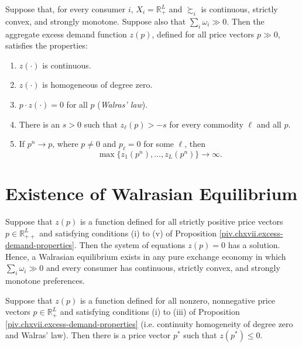\begin{prop}\label{piv.chxvii.excess-demand-properties}
    Suppose that, for every consumer $i$, $X_i = \mathbb{R}^L_+$ and $\succsim_i$ is continuous, strictly convex, and strongly monotone. Suppose also that $\sum_i \omega_i \gg 0$. Then the aggregate excess demand function $z(p)$, defined for all price vectors $p \gg 0$, satisfies the properties:
    \begin{enumerate}
        \item $z(\cdot)$ is continuous.
        \item $z(\cdot)$ is homogeneous of degree zero.
        \item $p \cdot z(\cdot) = 0$ for all $p$ (\emph{Walras' law}).
        \item There is an $s > 0$ such that $z_\ell(p) > -s$ for every commodity $\ell$ and all $p$.
        \item
        If $p^n \to p$, where $p \neq 0$ and $p_\ell = 0$ for some $\ell$, then
        \begin{equation*}
            \max \{z_1(p^n), \dots, z_L(p^n)\} \to \infty.
        \end{equation*}
    \end{enumerate}
\end{prop}


\section{Existence of Walrasian Equilibrium}

\begin{prop}
    Suppose that $z(p)$ is a function defined for all strictly positive price vectors $p \in \mathbb{R}^L_{++}$ and satisfying conditions (i) to (v) of Proposition \ref{piv.chxvii.excess-demand-properties}. Then the system of equations $z(p) = 0$ has a solution. Hence, a Walrasian equilibrium exists in any pure exchange economy in which $\sum_i \omega_i \gg 0$ and every consumer has continuous, strictly convex, and strongly monotone preferences.
\end{prop}

\begin{prop}
    Suppose that $z(p)$ is a function defined for all nonzero, nonnegative price vectors $p \in \mathbb{R}^L_+$ and satisfying conditions (i) to (iii) of Proposition \ref{piv.chxvii.excess-demand-properties} (i.e. continuity homogeneity of degree zero and Walras' law). Then there is a price vector $p^*$ such that $z(p^*) \leq 0$.
\end{prop}


